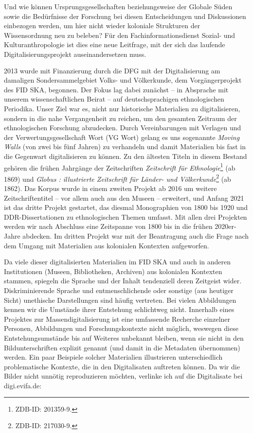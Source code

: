 \documentclass[a4paper,
fontsize=11pt,
oneside,
numbers=noperiodatend,
parskip=half-,
bibliography=totoc,
final
]{scrartcl}
\begin{document}
Und wie können Ursprungsgesellschaften beziehungsweise der Globale Süden
sowie die Bedürfnisse der Forschung bei diesen Entscheidungen und
Diskussionen einbezogen werden, um hier nicht wieder koloniale
Strukturen der Wissensordnung neu zu beleben? Für den
Fachinformationsdienst Sozial- und Kulturanthropologie ist dies eine
neue Leitfrage, mit der sich das laufende Digitalisierungsprojekt
auseinandersetzen muss.

2013 wurde mit Finanzierung durch die DFG mit der Digitalisierung am
damaligen Sondersammelgebiet Volks- und Völkerkunde, dem
Vorgängerprojekt des FID SKA, begonnen. Der Fokus lag dabei zunächst --
in Absprache mit unserem wissenschaftlichen Beirat -- auf
deutschsprachigen ethnologischen Periodika. Unser Ziel war es, nicht nur
historische Materialien zu digitalisieren, sondern in die nahe
Vergangenheit zu reichen, um den gesamten Zeitraum der ethnologischen
Forschung abzudecken. Durch Vereinbarungen mit Verlagen und der
Verwertungsgesellschaft Wort (VG Wort) gelang es uns sogenannte
\emph{Moving Walls} (von zwei bis fünf Jahren) zu verhandeln und damit
Materialien bis fast in die Gegenwart digitalisieren zu können. Zu den
ältesten Titeln in diesem Bestand gehören die frühen Jahrgänge der
Zeitschriften \emph{Zeitschrift für Ethnologie}\footnote{ZDB-ID:
  201359-9.} (ab 1869) und \emph{Globus : illustrierte Zeitschrift für
Länder- und Völkerkunde}\footnote{ZDB-ID: 217030-9.} (ab 1862). Das
Korpus wurde in einem zweiten Projekt ab 2016 um weitere
Zeitschriftentitel -- vor allem auch aus den Museen -- erweitert, und
Anfang 2021 ist das dritte Projekt gestartet, das diesmal Monographien
von 1800 bis 1920 und DDR-Dissertationen zu ethnologischen Themen
umfasst. Mit allen drei Projekten werden wir nach Abschluss eine
Zeitspanne von 1800 bis in die frühen 2020er-Jahre abdecken. Im dritten
Projekt war mit der Beantragung auch die Frage nach dem Umgang mit
Materialien aus kolonialen Kontexten aufgeworfen.

Da viele dieser digitalisierten Materialien im FID SKA und auch in
anderen Institutionen (Museen, Bibliotheken, Archiven) aus kolonialen
Kontexten stammen, spiegeln die Sprache und der Inhalt tendenziell deren
Zeitgeist wider. Diskriminierende Sprache und entmenschlichende oder
sonstige (aus heutiger Sicht) unethische Darstellungen sind häufig
vertreten. Bei vielen Abbildungen kennen wir die Umstände ihrer
Entstehung schlichtweg nicht. Innerhalb eines Projektes zur
Massendigitalisierung ist eine umfassende Recherche einzelner Personen,
Abbildungen und Forschungskontexte nicht möglich, weswegen diese
Entstehungsumstände bis auf Weiteres unbekannt bleiben, wenn sie nicht
in den Bildunterschriften explizit genannt (und damit in die Metadaten
übernommen) werden. Ein paar Beispiele solcher Materialien illustrieren
unterschiedlich problematische Kontexte, die in den Digitalisaten
auftreten können. Da wir die Bilder nicht unnötig reproduzieren möchten,
verlinke ich auf die Digitalisate bei digi.evifa.de:
\end{document}
